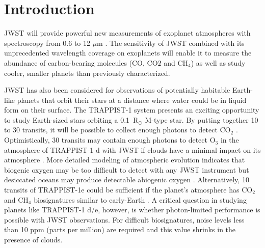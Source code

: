 \documentclass{aastex62}
\begin{document}

\section{Introduction} \label{sec:intro}

JWST will provide powerful new measurements of exoplanet atmospheres with spectroscopy from 0.6 to 12 $\mu$m
\citep{beichman2014pasp,greene2016jwst_trans,howe2017informationJWST,barstow2015jwstSystematics,schlawin2018JWSTforecasts}.
The sensitivity of JWST combined with its unprecedented wavelength coverage on exoplanets will enable it to measure the abundance of carbon-bearing molecules (CO, CO$2$ and CH$_4$) as well as study cooler, smaller planets than previously characterized.

JWST has also been considered for observations of potentially habitable Earth-like planets that orbit their stars at a distance where water could be in liquid form on their surface.
The TRAPPIST-1 system \citep{gillon2016trappist1Discovery,gillon2017trappist-1sevenp} presents an exciting opportunity to study Earth-sized stars orbiting a 0.1~R$_\odot$ M-type star.
By putting together 10 to 30 transits, it will be possible to collect enough photons to detect CO$_2$ \citep{barstow2016trappist1habitable,krissansen-totton2018trappist1eJWST,lustig-yaeger2019detectabilityTRAPPIST-1}.
Optimistically, 30 transits may contain enough photons to detect O$_3$ in the atmosphere of TRAPPIST-1 d with JWST if clouds have a minimal impact on its atmosphere \citep{barstow2016trappist1habitable}.
More detailed modeling of atmospheric evolution indicates that biogenic oxygen may be too difficult to detect with any JWST instrument but desiccated oceans may produce detectable abiogenic oxygen \citep{lustig-yaeger2019detectabilityTRAPPIST-1}.
Alternatively, 10 transits of TRAPPIST-1e could be sufficient if the planet's atmosphere has CO$_2$ and CH$_4$ biosignatures similar to early-Earth \citep{krissansen-totton2018trappist1eJWST}.
A critical question in studying planets like TRAPPIST-1 d/e, however, is whether photon-limited performance is possible with JWST observations.
For difficult biosignatures, noise levels less than 10 ppm (parts per million) are required and this value shrinks in the presence of clouds.
\end{document}
